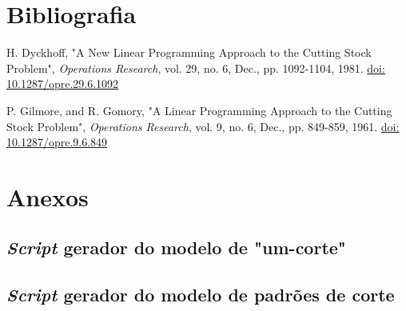 \documentclass[12pt, a4paper, titlepage]{article}
\begin{document}
\section{Bibliografia}
\def\refname{}
\vspace{-1.5cm}
\begin{thebibliography}{9}
    H. Dyckhoff, "A New Linear Programming Approach to the Cutting Stock Problem",
    \emph{Operations Research}, vol. 29, no. 6, Dec., pp. 1092-1104, 1981.
    \href{https://doi.org/10.1287/opre.29.6.1092}{doi: 10.1287/opre.29.6.1092}

    P. Gilmore, and R. Gomory, "A Linear Programming Approach to the Cutting Stock Problem",
    \emph{Operations Research}, vol. 9, no. 6, Dec., pp. 849-859, 1961.
    \href{https://doi.org/10.1287/opre.9.6.849}{doi: 10.1287/opre.9.6.849}
\end{thebibliography}

\section{Anexos}

\begin{landscape}
    \subsection{\emph{Script} gerador do modelo de "um-corte"{}}
    \label{code:one-cut}
    
    \pagebreak

    \subsection{\emph{Script} gerador do modelo de padrões de corte}
    \label{code:cutting-patterns}
    
\end{landscape}
\end{document}
